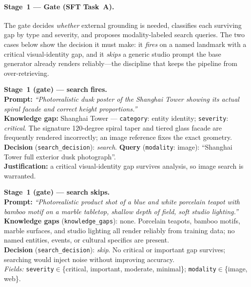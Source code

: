 \paragraph{Stage~1 --- Gate (SFT Task~A).}
The gate decides \emph{whether} external grounding is needed, classifies each surviving
gap by type and severity, and proposes modality-labeled search queries. The two cases
below show the decision it must make: it \emph{fires} on a named landmark with a critical
visual-identity gap, and it \emph{skips} a generic studio prompt the base generator
already renders reliably---the discipline that keeps the pipeline from over-retrieving.

\begin{examplebox}
\small
\textbf{Stage~1 (gate) --- search fires.}\\[2pt]
\textbf{Prompt:} \emph{``Photorealistic dusk poster of the Shanghai Tower showing its actual spiral facade and correct height proportions.''}\\[3pt]
\textbf{Knowledge gap:} Shanghai Tower --- \texttt{category}: entity identity; \texttt{severity}: \emph{critical}. The signature 120-degree spiral taper and tiered glass facade are frequently rendered incorrectly; an image reference fixes the exact geometry.\\[2pt]
\textbf{Decision} (\texttt{search\_decision}): \emph{search}. \quad \textbf{Query} (\texttt{modality}: image): ``Shanghai Tower full exterior dusk photograph''.\\[2pt]
\textbf{Justification:} a critical visual-identity gap survives analysis, so image search is warranted.
\end{examplebox}

\begin{examplebox}
\small
\textbf{Stage~1 (gate) --- search skips.}\\[2pt]
\textbf{Prompt:} \emph{``Photorealistic product shot of a blue and white porcelain teapot with bamboo motif on a marble tabletop, shallow depth of field, soft studio lighting.''}\\[3pt]
\textbf{Knowledge gaps} (\texttt{knowledge\_gaps}): none. Porcelain teapots, bamboo motifs, marble surfaces, and studio lighting all render reliably from training data; no named entities, events, or cultural specifics are present.\\[2pt]
\textbf{Decision} (\texttt{search\_decision}): \emph{skip}. No critical or important gap survives; searching would inject noise without improving accuracy.\\[2pt]
{\footnotesize\emph{Fields:} \texttt{severity}$\in$\{critical, important, moderate, minimal\}; \texttt{modality}$\in$\{image, web\}.}
\end{examplebox}

